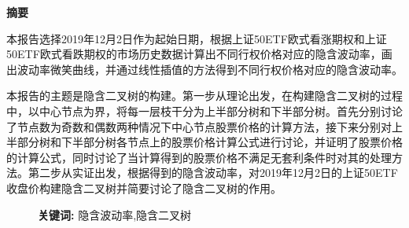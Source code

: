 \begin{center}
    \thispagestyle{empty}
    \fontsize{18pt}{\baselineskip}\bf\textsf{摘\quad 要}
    \vspace{10pt}
    
\end{center}

\vspace{10pt}

本报告选择2019年12月2日作为起始日期，根据上证50ETF欧式看涨期权和上证50ETF欧式看跌期权的市场历史数据计算出不同行权价格对应的隐含波动率，画出波动率微笑曲线，并通过线性插值的方法得到不同行权价格对应的隐含波动率。

本报告的主题是隐含二叉树的构建。第一步从理论出发，在构建隐含二叉树的过程中，以中心节点为界，将每一层枝干分为上半部分树和下半部分树。首先分别讨论了节点数为奇数和偶数两种情况下中心节点股票价格的计算方法，接下来分别对上半部分树和下半部分树各节点上的股票价格计算公式进行讨论，并证明了股票价格的计算公式，同时讨论了当计算得到的股票价格不满足无套利条件时对其的处理方法。第二步从实证出发，根据得到的隐含波动率，对2019年12月2日的上证50ETF收盘价构建隐含二叉树并简要讨论了隐含二叉树的作用。



\begin{figure}[h]
    \textbf{关键词:} 隐含波动率,隐含二叉树
\end{figure}